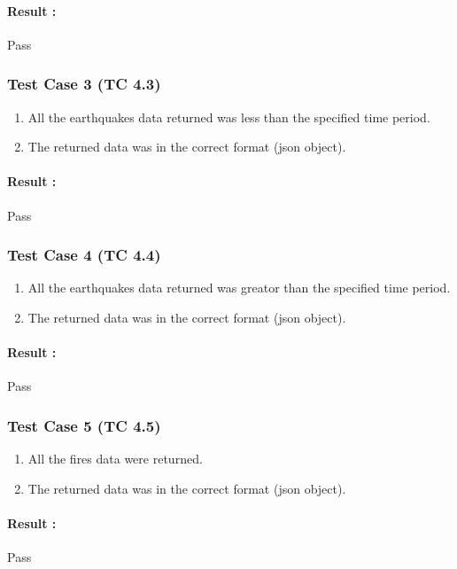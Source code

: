 \paragraph{Result :} Pass

\subsubsection{Test Case 3 (TC 4.3)}

\begin{enumerate}
	\item All the earthquakes data returned was less than the specified time period.
	\item The returned data was in the correct format (json object).
\end{enumerate}

\paragraph{Result :} Pass

\subsubsection{Test Case 4 (TC 4.4)}

\begin{enumerate}
	\item All the earthquakes data returned was greator than the specified time period.
	\item The returned data was in the correct format (json object).
\end{enumerate}

\paragraph{Result :} Pass


\subsubsection{Test Case 5 (TC 4.5)}

\begin{enumerate}
	\item All the fires data were returned.
	\item The returned data was in the correct format (json object).
\end{enumerate}

\paragraph{Result :} Pass

